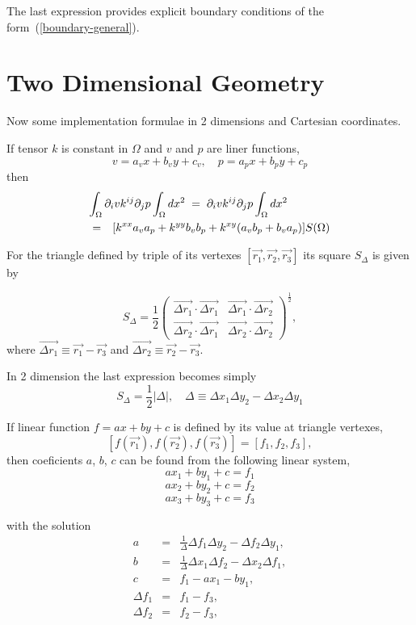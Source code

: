 \documentclass{article}
\def\eqn#1{\begin{displaymath}#1\end{displaymath}}
\def\eqnm#1{\begin{eqnarray*}#1\end{eqnarray*}}
\def\eqnml#1#2{\begin{eqnarray}\label{#1}#2\end{eqnarray}}
\def\arr#1#2{\begin{array}{#1}#2\end{array}}
\def\rf#1{(\ref{#1})}
\def\p{\par}
\def\EQS{\; = \;}
\theoremstyle{marginbreak} \theorembodyfont{\itshape}
\begin{document}
\par
The last expression provides explicit boundary
conditions of the form~\rf{boundary-general}.



\section{Two Dimensional Geometry}

Now some implementation formulae in 2 dimensions and Cartesian coordinates.

\p
If tensor $k$ is constant in $\Omega$ and $v$ and $p$ are liner functions,
$$
v = a_v x + b_v y + c_v, \quad p = a_p x + b_p y + c_p
$$
then
\eqnml{triangle_volume_integral}{
\lefteqn{\int_\Omega  \partial_i v k^{ij} \partial_j p \int_\Omega dx^2
\EQS \partial_i v k^{ij} \partial_j p \int_\Omega  dx^2}
\\ \nonumber
&=& [k^{xx} a_v a_p + k^{yy} b_v b_p + k^{xy} (a_v b_p + b_v a_p)] S(\Omega)
}

For the triangle defined by triple of its vertexes
$[\vec{r_1}, \vec{r_2}, \vec{r_3}]$ its square $S_\Delta$ is given by

\eqn{
S_\Delta = \frac{1}{2}
    \left(\arr{cc}{
        \vec{\Delta r_1} \cdot \vec{\Delta r_1}
            & \vec{\Delta r_1} \cdot \vec{\Delta r_2} \\
        \vec{\Delta r_2} \cdot \vec{\Delta r_1}
            & \vec{\Delta r_2} \cdot \vec{\Delta r_2}
    }\right)^\frac{1}{2},
}
where $\vec{\Delta r_1} \equiv \vec{r_1} - \vec{r_3}$ and
$\vec{\Delta r_2} \equiv \vec{r_2} - \vec{r_3}$.
\p
In 2 dimension the last expression becomes simply
\eqn{
S_\Delta = \frac{1}{2} |\Delta|,
\quad \Delta \equiv\Delta x_1 \Delta y_2 - \Delta x_2 \Delta y_1
}


\p

If linear function $f = ax + by + c$ is defined by its value at triangle
vertexes,
$$
[f(\vec{r_1}), f(\vec{r_2}), f(\vec{r_3})] = [f_1, f_2, f_3],
$$
then coeficients $a$, $b$, $c$
can be found from the following linear system,
\eqn{
ax_1 + by_1 + c = f_1
}\eqn{
ax_2 + by_2 + c = f_2
}\eqn{
ax_3 + by_3 + c = f_3
}

with the solution
\eqnm{
a &=& \frac{1}{\Delta}{\Delta f_1 \Delta y_2 - \Delta f_2 \Delta y_1 }, \\
b &=& \frac{1}{\Delta}{\Delta x_1 \Delta f_2 - \Delta x_2 \Delta f_1 }, \\
c &=& f_ 1 - ax_1 - by_1, \\
\Delta f_1 &=& f_1 - f_3, \\
\Delta f_2 &=& f_2 - f_3,
}
\end{document}
